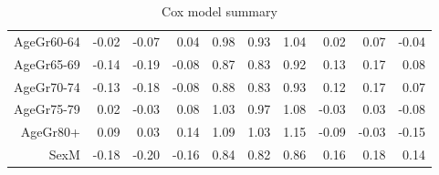 \begin{table}[ht]
\begin{tabular}{rrrrrrrrrr}
  AgeGr60-64 & -0.02 & -0.07 & 0.04 & 0.98 & 0.93 & 1.04 & 0.02 & 0.07 & -0.04 \\ 
  AgeGr65-69 & -0.14 & -0.19 & -0.08 & 0.87 & 0.83 & 0.92 & 0.13 & 0.17 & 0.08 \\ 
  AgeGr70-74 & -0.13 & -0.18 & -0.08 & 0.88 & 0.83 & 0.93 & 0.12 & 0.17 & 0.07 \\ 
  AgeGr75-79 & 0.02 & -0.03 & 0.08 & 1.03 & 0.97 & 1.08 & -0.03 & 0.03 & -0.08 \\ 
  AgeGr80+ & 0.09 & 0.03 & 0.14 & 1.09 & 1.03 & 1.15 & -0.09 & -0.03 & -0.15 \\ 
  SexM & -0.18 & -0.20 & -0.16 & 0.84 & 0.82 & 0.86 & 0.16 & 0.18 & 0.14 \\ 
   \hline
\end{tabular}
\caption{Cox model summary} 
\end{table}
